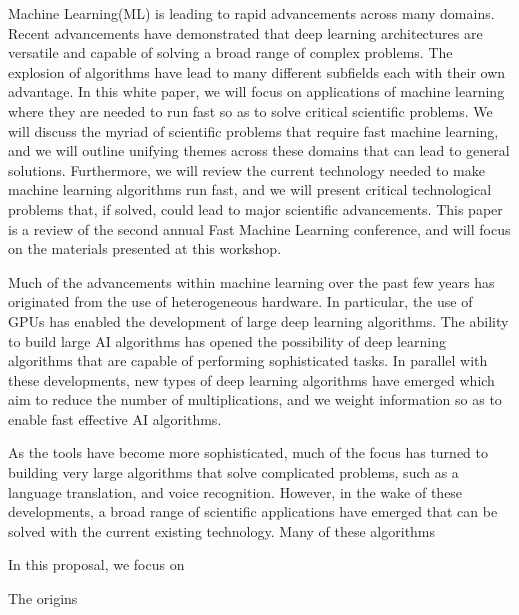Machine Learning(ML) is leading to rapid advancements across many domains. Recent advancements have demonstrated that deep learning architectures are versatile and capable of solving a broad range of complex problems. The explosion of algorithms have lead to many different subfields each with their own advantage. In this white paper, we will focus on applications of machine learning where they are needed to run fast so as to solve critical scientific problems. We will discuss the myriad of scientific problems that require fast machine learning, and we will outline unifying themes across these domains that can lead to general solutions. Furthermore, we will review the current technology needed to make machine learning algorithms run fast, and we will present critical technological problems that, if solved, could lead to major scientific advancements. This paper is a review of the second annual Fast Machine Learning conference\cite{FMLConf2}, and will focus on the materials presented at this workshop. 

Much of the advancements within machine learning over the past few years has originated from the use of heterogeneous hardware. In particular, the use of GPUs has enabled the development of large deep learning algorithms.  The ability to build large AI algorithms has opened the possibility of deep learning algorithms that are capable of performing sophisticated tasks. In parallel with these developments, new types of deep learning algorithms have emerged which aim to reduce the number of multiplications, and we weight information so as to enable fast effective AI algorithms. 

As the tools have become more sophisticated, much of the focus has turned to building very large  algorithms that solve complicated problems, such as a language translation, and voice recognition. However, in the wake of these developments, a broad range of scientific applications have emerged that can be solved with the current existing technology. Many of these algorithms 

In this proposal, we focus on 



The origins


